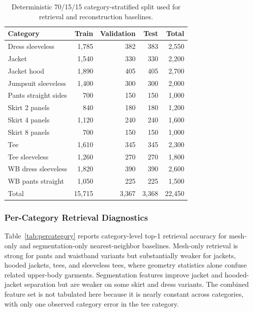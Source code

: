 \documentclass[pdflatex,sn-mathphys-num]{sn-jnl}
\begin{document}
\begin{table}[!htbp]
\caption{Deterministic 70/15/15 category-stratified split used for retrieval and reconstruction baselines.}\label{tab:splits}
\centering
\begin{tabular}{lrrrr}
\toprule
Category & Train & Validation & Test & Total \\
\midrule
Dress sleeveless & 1,785 & 382 & 383 & 2,550 \\
Jacket & 1,540 & 330 & 330 & 2,200 \\
Jacket hood & 1,890 & 405 & 405 & 2,700 \\
Jumpsuit sleeveless & 1,400 & 300 & 300 & 2,000 \\
Pants straight sides & 700 & 150 & 150 & 1,000 \\
Skirt 2 panels & 840 & 180 & 180 & 1,200 \\
Skirt 4 panels & 1,120 & 240 & 240 & 1,600 \\
Skirt 8 panels & 700 & 150 & 150 & 1,000 \\
Tee & 1,610 & 345 & 345 & 2,300 \\
Tee sleeveless & 1,260 & 270 & 270 & 1,800 \\
WB dress sleeveless & 1,820 & 390 & 390 & 2,600 \\
WB pants straight & 1,050 & 225 & 225 & 1,500 \\
\midrule
Total & 15,715 & 3,367 & 3,368 & 22,450 \\
\bottomrule
\end{tabular}
\end{table}

\subsubsection{Per-Category Retrieval Diagnostics}\label{sec:percat}

Table~\ref{tab:percategory} reports category-level top-1 retrieval accuracy for mesh-only and segmentation-only nearest-neighbor baselines. Mesh-only retrieval is strong for pants and waistband variants but substantially weaker for jackets, hooded jackets, tees, and sleeveless tees, where geometry statistics alone confuse related upper-body garments. Segmentation features improve jacket and hooded-jacket separation but are weaker on some skirt and dress variants. The combined feature set is not tabulated here because it is nearly constant across categories, with only one observed category error in the tee category.
\end{document}
